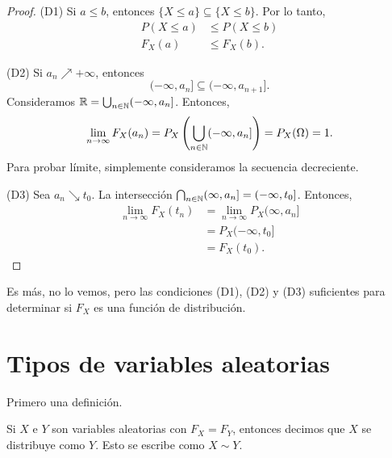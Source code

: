 \begin{proof}
    (D1) Si $a \leq b$, entonces $\{X \leq a\} \subseteq \{X \leq b\}$. Por lo tanto,
    \begin{align*}
        P(X \leq a) &\leq P(X \leq b) \\
        F_X(a) &\leq F_X(b).
    \end{align*}

    \medskip

    (D2) Si $a_n \nearrow + \infty$, entonces 
    \begin{equation*}
        (-\infty, a_n] \subseteq (-\infty, a_{n+1}].
    \end{equation*}
    Consideramos $\mathbb{R} = \bigcup_{n \in \mathbb{N}} (-\infty, a_n]$. Entonces,
    \begin{equation*}
        \lim_{n \to \infty} F_X(a_n) = P_X\left(\bigcup_{n \in \mathbb{N}} (-\infty, a_n]\right) = P_X(\Omega) = 1.
    \end{equation*}
    Para probar límite, simplemente consideramos la secuencia decreciente.

    \medskip

    (D3) Sea $a_n \searrow t_0$. La intersección $\bigcap_{n \in \mathbb{N}} (\infty, a_n] = (-\infty, t_0]$. Entonces,
    \begin{align*}
        \lim_{n \to \infty} F_X(t_n) &= \lim_{n \to \infty} P_X(\infty, a_n] \\
        &=P_X(-\infty, t_0] \\
        &= F_X(t_0).
    \end{align*}
\end{proof}

Es más, no lo vemos, pero las condiciones (D1), (D2) y (D3) suficientes para determinar si $F_X$ es una función de distribución.


\section{Tipos de variables aleatorias}

Primero una definición.

\begin{definition}
    Si $X$ e $Y$ son variables aleatorias con $F_X = F_Y$, entonces decimos que $X$ se distribuye como $Y$. Esto se escribe como $X \sim Y$.
\end{definition}

